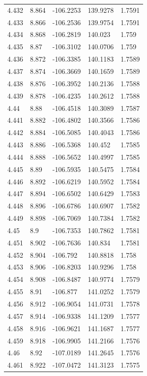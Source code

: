\begin{tabular}{lllll}
4.432 & 8.864 & -106.2253 & 139.9278 & 1.7591 \\
4.433 & 8.866 & -106.2536 & 139.9754 & 1.7591 \\
4.434 & 8.868 & -106.2819 & 140.023 & 1.759 \\
4.435 & 8.87 & -106.3102 & 140.0706 & 1.759 \\
4.436 & 8.872 & -106.3385 & 140.1183 & 1.7589 \\
4.437 & 8.874 & -106.3669 & 140.1659 & 1.7589 \\
4.438 & 8.876 & -106.3952 & 140.2136 & 1.7588 \\
4.439 & 8.878 & -106.4235 & 140.2612 & 1.7588 \\
4.44 & 8.88 & -106.4518 & 140.3089 & 1.7587 \\
4.441 & 8.882 & -106.4802 & 140.3566 & 1.7586 \\
4.442 & 8.884 & -106.5085 & 140.4043 & 1.7586 \\
4.443 & 8.886 & -106.5368 & 140.452 & 1.7585 \\
4.444 & 8.888 & -106.5652 & 140.4997 & 1.7585 \\
4.445 & 8.89 & -106.5935 & 140.5475 & 1.7584 \\
4.446 & 8.892 & -106.6219 & 140.5952 & 1.7584 \\
4.447 & 8.894 & -106.6502 & 140.6429 & 1.7583 \\
4.448 & 8.896 & -106.6786 & 140.6907 & 1.7582 \\
4.449 & 8.898 & -106.7069 & 140.7384 & 1.7582 \\
4.45 & 8.9 & -106.7353 & 140.7862 & 1.7581 \\
4.451 & 8.902 & -106.7636 & 140.834 & 1.7581 \\
4.452 & 8.904 & -106.792 & 140.8818 & 1.758 \\
4.453 & 8.906 & -106.8203 & 140.9296 & 1.758 \\
4.454 & 8.908 & -106.8487 & 140.9774 & 1.7579 \\
4.455 & 8.91 & -106.877 & 141.0252 & 1.7579 \\
4.456 & 8.912 & -106.9054 & 141.0731 & 1.7578 \\
4.457 & 8.914 & -106.9338 & 141.1209 & 1.7577 \\
4.458 & 8.916 & -106.9621 & 141.1687 & 1.7577 \\
4.459 & 8.918 & -106.9905 & 141.2166 & 1.7576 \\
4.46 & 8.92 & -107.0189 & 141.2645 & 1.7576 \\
4.461 & 8.922 & -107.0472 & 141.3123 & 1.7575 \\

\end{tabular}
